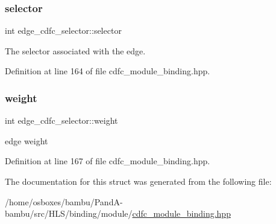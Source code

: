 \subsubsection{\texorpdfstring{selector}{selector}}
{\footnotesize\ttfamily int edge\+\_\+cdfc\+\_\+selector\+::selector}



The selector associated with the edge. 



Definition at line 164 of file cdfc\+\_\+module\+\_\+binding.\+hpp.

\mbox{\label{structedge__cdfc__selector_af9c1537182fc07ee4af56dc3b38b6565}} 
\subsubsection{\texorpdfstring{weight}{weight}}
{\footnotesize\ttfamily int edge\+\_\+cdfc\+\_\+selector\+::weight}



edge weight 



Definition at line 167 of file cdfc\+\_\+module\+\_\+binding.\+hpp.



The documentation for this struct was generated from the following file\+:\begin{DoxyCompactItemize}
\item 
/home/osboxes/bambu/\+Pand\+A-\/bambu/src/\+H\+L\+S/binding/module/\hyperlink{cdfc__module__binding_8hpp}{cdfc\+\_\+module\+\_\+binding.\+hpp}\end{DoxyCompactItemize}
